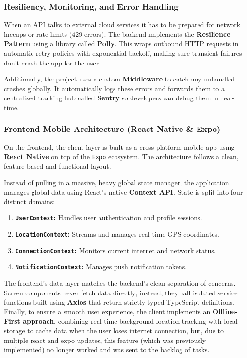 \subsubsection{Resiliency, Monitoring, and Error Handling}
When an API talks to external cloud services it has to be prepared for network hiccups or rate limits ($429$ errors). The backend implements the \textbf{Resilience Pattern} using a library called \textbf{Polly}. This wraps outbound HTTP requests in automatic retry policies with exponential backoff, making sure transient failures don't crash the app for the user.

Additionally, the project uses a custom \textbf{Middleware} to catch any unhandled crashes globally. It automatically logs these errors and forwards them to a centralized tracking hub called \textbf{Sentry} so developers can debug them in real-time.

\subsubsection{Frontend Mobile Architecture (React Native \& Expo)}
On the frontend, the client layer is built as a cross-platform mobile app using \textbf{React Native} on top of the \texttt{Expo} ecosystem. The architecture follows a clean, feature-based and functional layout. 

Instead of pulling in a massive, heavy global state manager, the application manages global data using React’s native \textbf{Context API}. State is split into four distinct domains:
\begin{enumerate}
    \item \textbf{\texttt{UserContext}:} Handles user authentication and profile sessions.
    \item \textbf{\texttt{LocationContext}:} Streams and manages real-time GPS coordinates.
    \item \textbf{\texttt{ConnectionContext}:} Monitors current internet and network status.
    \item \textbf{\texttt{NotificationContext}:} Manages push notification tokens.
\end{enumerate}

The frontend's data layer matches the backend's clean separation of concerns. Screen components never fetch data directly; instead, they call isolated service functions built using \textbf{Axios} that return strictly typed TypeScript definitions. Finally, to ensure a smooth user experience, the client implements an \textbf{Offline-First approach}, combining real-time background location tracking with local storage to cache data when the user loses internet connection, but, due to multiple react and expo updates, this feature (which was previously implemented) no longer worked and was sent to the backlog of tasks.


